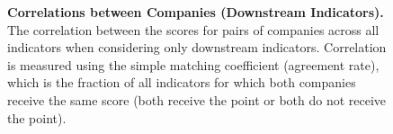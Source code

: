 \begin{figure}
\caption{\textbf{Correlations between Companies (Downstream Indicators).} The correlation between the scores for pairs of companies across all indicators when considering only downstream indicators. Correlation is measured using the simple matching coefficient (\ie agreement rate), which is the fraction of all indicators for which both companies receive the same score (\ie both receive the point or both do not receive the point).
}
\label{fig:downstream-correlations}
\end{figure}

